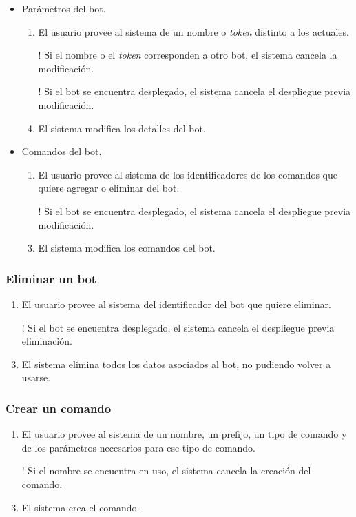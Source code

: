 \begin{itemize}
	\item Parámetros del bot.
	\begin{enumerate}
		\item El usuario provee al sistema de un nombre o \textit{token} distinto a los actuales.
		\item[!] Si el nombre o el \textit{token} corresponden a otro bot, el sistema cancela la modificación.
		\item[!] Si el bot se encuentra desplegado, el sistema cancela el despliegue previa modificación.
		\item El sistema modifica los detalles del bot.
	\end{enumerate}
	
	\item Comandos del bot.
	\begin{enumerate}
		\item El usuario provee al sistema de los identificadores de los comandos que quiere agregar o eliminar del bot.
		\item[!] Si el bot se encuentra desplegado, el sistema cancela el despliegue previa modificación.
		\item El sistema modifica los comandos del bot.
	\end{enumerate}
\end{itemize}

\subsubsection{Eliminar un bot}

\begin{enumerate}
	\item El usuario provee al sistema del identificador del bot que quiere eliminar.
	\item[!] Si el bot se encuentra desplegado, el sistema cancela el despliegue previa eliminación.
	\item El sistema elimina todos los datos asociados al bot, no pudiendo volver a usarse.
\end{enumerate}

\subsubsection{Crear un comando}

\begin{enumerate}
	\item El usuario provee al sistema de un nombre, un prefijo, un tipo de comando y de los parámetros necesarios para ese tipo de comando.
	\item[!] Si el nombre se encuentra en uso, el sistema cancela la creación del comando.
	\item El sistema crea el comando.
\end{enumerate}

